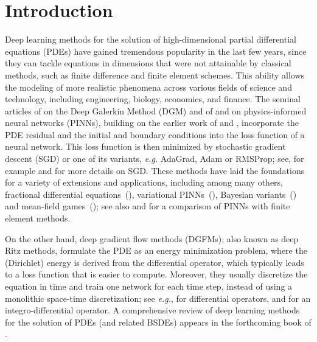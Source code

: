 \documentclass[11pt,a4paper,reqno]{amsart}
\numberwithin{equation}{section}
\theoremstyle{plain}
\theoremstyle{definition}
\begin{document}
\section{Introduction}

Deep learning methods for the solution of high-dimensional partial differential equations (PDEs) have gained tremendous popularity in the last few years, since they can tackle equations in dimensions that were not attainable by classical methods, such as finite difference and finite element schemes.
This ability allows the modeling of more realistic phenomena across various fields of science and technology, including engineering, biology, economics, and finance.
The seminal articles of \citet{sirignano2018dgm} on the Deep Galerkin Method (DGM) and of \citet{Raissi2018} and \citet{PINN} on physics-informed neural networks (PINNs), building on the earlier work of \citet{Lagaris1998} and \citet{Lagaris2000}, incorporate the PDE residual and the initial and boundary conditions into the loss function of a neural network.
This loss function is then minimized by stochastic gradient descent (SGD) or one of its variants, \textit{e.g.} AdaGrad, Adam or RMSProp; see, for example \citet{Latz,Jin1,Jin2} and \citet{MR3732944,MR4119247} for more details on SGD.
These methods have laid the foundations for a variety of extensions and applications, including among many others, fractional differential equations~(\citet{Pang2019}), variational PINNs~(\citet{kharazmi2021variational}), Bayesian variants~(\citet{yang2021b,Jin3}) and mean-field games~(\citet{10572276}); see also \citet{latz1} and \citet{SIKORA2024102340} for a comparison of PINNs with finite element methods.

On the other hand, deep gradient flow methods (DGFMs), also known as deep Ritz methods, formulate the PDE as an energy minimization problem, where the (Dirichlet) energy is derived from the differential operator, which typically leads to a loss function that is easier to compute.
Moreover, they usually discretize the equation in time and train one network for each time step, instead of using a monolithic space-time discretization; see \textit{e.g.}, \citet{E_Yu_2017,Liao_Ming_2019,georgoulis2023discrete,park2023deep,papapantoleon2024time,Bruna_2024} for differential operators, and \citet{georgoulis2024deep} for an integro-differential operator.
A comprehensive review of deep learning methods for the solution of PDEs (and related BSDEs) appears in the forthcoming book of \citet{jentzen2025mathematicalintroductiondeeplearning}.
\end{document}
